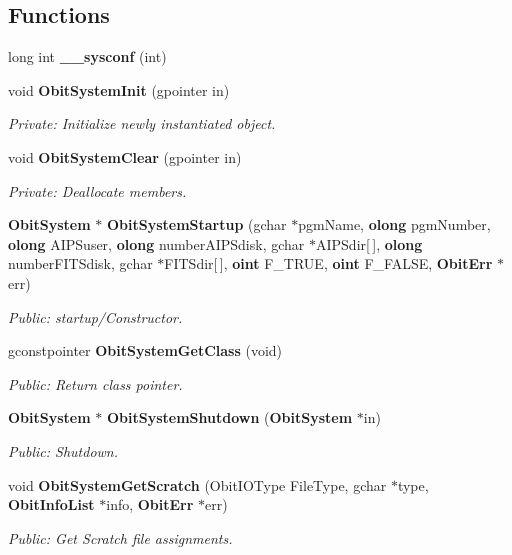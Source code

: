 \subsection*{Functions}
\begin{CompactItemize}
\item 
long int {\bf \_\-\_\-sysconf} (int)
\item 
void {\bf Obit\-System\-Init} (gpointer in)
\begin{CompactList}\small\item\em Private: Initialize newly instantiated object. \item\end{CompactList}\item 
void {\bf Obit\-System\-Clear} (gpointer in)
\begin{CompactList}\small\item\em Private: Deallocate members. \item\end{CompactList}\item 
{\bf Obit\-System} $\ast$ {\bf Obit\-System\-Startup} (gchar $\ast$pgm\-Name, {\bf olong} pgm\-Number, {\bf olong} AIPSuser, {\bf olong} number\-AIPSdisk, gchar $\ast$AIPSdir[$\,$], {\bf olong} number\-FITSdisk, gchar $\ast$FITSdir[$\,$], {\bf oint} F\_\-TRUE, {\bf oint} F\_\-FALSE, {\bf Obit\-Err} $\ast$err)
\begin{CompactList}\small\item\em Public: startup/Constructor. \item\end{CompactList}\item 
gconstpointer {\bf Obit\-System\-Get\-Class} (void)
\begin{CompactList}\small\item\em Public: Return class pointer. \item\end{CompactList}\item 
{\bf Obit\-System} $\ast$ {\bf Obit\-System\-Shutdown} ({\bf Obit\-System} $\ast$in)
\begin{CompactList}\small\item\em Public: Shutdown. \item\end{CompactList}\item 
void {\bf Obit\-System\-Get\-Scratch} (Obit\-IOType File\-Type, gchar $\ast$type, {\bf Obit\-Info\-List} $\ast$info, {\bf Obit\-Err} $\ast$err)
\begin{CompactList}\small\item\em Public: Get Scratch file assignments. \item\end{CompactList}\item 

\end{CompactItemize}
